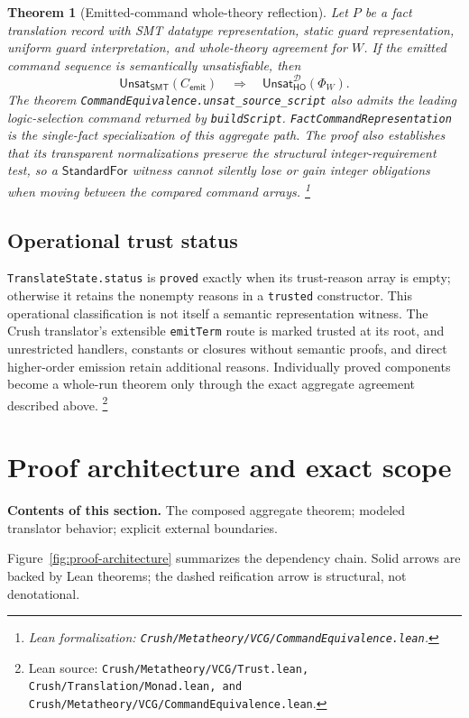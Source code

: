 \documentclass[11pt]{article}
\newtheorem{theorem}[definition]{Theorem}
\theoremstyle{remark}
\newcommand{\leanfile}[1]{\footnote{Lean formalization: \texttt{Crush/Metatheory/#1}.}}
\newcommand{\leanpaths}[1]{\footnote{Lean source: \texttt{#1}.}}
\newcommand{\sectioncontents}[1]{%
  \smallskip\noindent\textbf{Contents of this section.} #1\par\medskip}
\newcommand{\unsat}{\mathsf{Unsat}}
\begin{document}
\begin{theorem}[Emitted-command whole-theory reflection]
Let $P$ be a fact translation record with SMT datatype representation, static guard
representation, uniform guard interpretation, and whole-theory agreement for
$W$. If the emitted command sequence is semantically unsatisfiable, then
\[
 \unsat_{\mathsf{SMT}}(C_{\mathsf{emit}})
 \quad\Longrightarrow\quad
 \unsat_{\mathsf{HO}}^{\mathcal D}(\Phi_W).
\]
The theorem \texttt{CommandEquivalence.unsat\_source\_script} also admits the
leading logic-selection command returned by \texttt{buildScript}.
\texttt{FactCommandRepresentation} is the single-fact specialization
of this aggregate path. The proof also establishes that its transparent
normalizations preserve the structural integer-requirement test, so a
$\mathsf{StandardFor}$ witness cannot silently lose or gain integer obligations
when moving between the compared command arrays.
\leanfile{VCG/CommandEquivalence.lean}
\end{theorem}

\subsection{Operational trust status}

\texttt{TranslateState.status} is \texttt{proved} exactly when its trust-reason
array is empty; otherwise it retains the nonempty reasons in a \texttt{trusted}
constructor. This operational classification is not itself a semantic
representation witness. The Crush translator's extensible \texttt{emitTerm} route is
marked trusted at its root, and unrestricted handlers, constants or closures
without semantic proofs, and direct higher-order emission retain additional reasons.
Individually proved components become a whole-run theorem only through the exact
aggregate agreement described above.
\leanpaths{Crush/Metatheory/VCG/Trust.lean, Crush/Translation/Monad.lean, and Crush/Metatheory/VCG/CommandEquivalence.lean}

\section{Proof architecture and exact scope}
\sectioncontents{The composed aggregate theorem; modeled translator behavior; explicit external boundaries.}

Figure~\ref{fig:proof-architecture} summarizes the dependency chain. Solid
arrows are backed by Lean theorems; the dashed reification arrow is structural,
not denotational.
\end{document}
